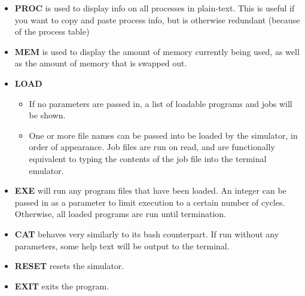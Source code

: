 \documentclass[paper=a4, fontsize=11pt]{scrartcl} %
\numberwithin{equation}{section} %
\numberwithin{figure}{section} %
\numberwithin{table}{section} %
\begin{document}
\begin{itemize}
	\item \textbf{PROC} is used to display info on all processes in plain-text. This is useful if you want to copy and paste process info, but is otherwise redundant (because of the process table)
	\item \textbf{MEM} is used to display the amount of memory currently being used, as well as the amount of memory that is swapped out.
	\item \textbf{LOAD}
		\begin{itemize}
			\item If no parameters are passed in, a list of loadable programs and jobs will be shown.
			\item One or more file names can be passed into be loaded by the simulator, in order of appearance. Job files are run on read, and are functionally equivalent to typing the contents of the job file into the terminal emulator.
		\end{itemize}
	\item \textbf{EXE} will run any program files that have been loaded. An integer can be passed in as a parameter to limit execution to a certain number of cycles. Otherwise, all loaded programs are run until termination.
	\item \textbf{CAT} behaves very similarly to its bash counterpart. If run without any parameters, some help text will be output to the terminal.
	\item \textbf{RESET} resets the simulator.
	\item \textbf{EXIT} exits the program.
\end{itemize}
\end{document}
